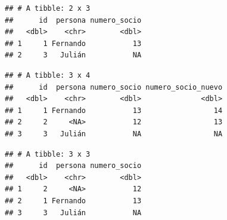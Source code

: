 \documentclass[]{book}
\newenvironment{Shaded}{\begin{snugshade}}{\end{snugshade}}
\newcommand{\KeywordTok}[1]{\textcolor[rgb]{0.13,0.29,0.53}{\textbf{#1}}}
\newcommand{\DataTypeTok}[1]{\textcolor[rgb]{0.13,0.29,0.53}{#1}}
\newcommand{\DecValTok}[1]{\textcolor[rgb]{0.00,0.00,0.81}{#1}}
\newcommand{\StringTok}[1]{\textcolor[rgb]{0.31,0.60,0.02}{#1}}
\newcommand{\CommentTok}[1]{\textcolor[rgb]{0.56,0.35,0.01}{\textit{#1}}}
\newcommand{\OperatorTok}[1]{\textcolor[rgb]{0.81,0.36,0.00}{\textbf{#1}}}
\newcommand{\NormalTok}[1]{#1}
\theoremstyle{definition}
\theoremstyle{definition}
\theoremstyle{definition}
\theoremstyle{remark}
\begin{document}
\begin{Shaded}
\end{Shaded}

\begin{verbatim}
## # A tibble: 2 x 3
##      id  persona numero_socio
##   <dbl>    <chr>        <dbl>
## 1     1 Fernando           13
## 2     3   Julián           NA
\end{verbatim}

\begin{Shaded}
\end{Shaded}

\begin{verbatim}
## # A tibble: 3 x 4
##      id  persona numero_socio numero_socio_nuevo
##   <dbl>    <chr>        <dbl>              <dbl>
## 1     1 Fernando           13                 14
## 2     2     <NA>           12                 13
## 3     3   Julián           NA                 NA
\end{verbatim}

\begin{Shaded}
\end{Shaded}

\begin{verbatim}
## # A tibble: 3 x 3
##      id  persona numero_socio
##   <dbl>    <chr>        <dbl>
## 1     2     <NA>           12
## 2     1 Fernando           13
## 3     3   Julián           NA
\end{verbatim}

\begin{Shaded}
\end{Shaded}
\end{document}
